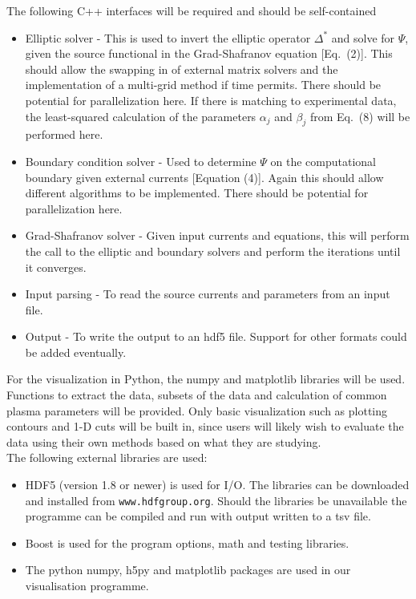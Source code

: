 \documentclass[paper=letter, fontsize=11pt]{scrartcl} %
\begin{document}
The following C++ interfaces will be required and should be self-contained
\begin{itemize}
\item Elliptic solver - This is used to invert the elliptic operator $\Delta^*$ and solve for $\Psi$, given the source functional in the Grad-Shafranov equation [Eq.~(2)]. This should allow the swapping in of external matrix solvers and the implementation of a multi-grid method if time permits. There should be potential for parallelization here. If there is matching to experimental data, the least-squared calculation of the parameters $\alpha_j$ and $\beta_j$ from Eq.~(8) will be performed here. 
\item Boundary condition solver - Used to determine $\Psi$ on the computational boundary given external currents [Equation (4)]. Again this should allow different algorithms to be implemented. There should be potential for parallelization here. 
\item Grad-Shafranov solver - Given input currents and equations, this will perform the call to the elliptic and boundary solvers and perform the iterations until it converges.
\item Input parsing - To read the source currents and parameters from an input file.
\item Output - To write the output to an hdf5 file. Support for other formats could be added eventually.
\end{itemize}

For the visualization in Python, the numpy and matplotlib libraries will be used. Functions to extract the data, subsets of the data and calculation of common plasma parameters will be provided. Only basic visualization such as plotting contours and 1-D cuts will be built in, since users will likely wish to evaluate the data using their own methods based on what they are studying. \\

The following external libraries are used:
\begin{itemize}
\item HDF5 (version 1.8 or newer) is used for I/O. The libraries can be downloaded and installed from \texttt{www.hdfgroup.org}. Should the libraries be unavailable the programme can be compiled and run with output written to a tsv file. 
\item Boost is used for the program options, math and testing libraries. 
\item The python numpy, h5py and matplotlib packages are used in our visualisation programme. 
\end{itemize}
\end{document}
